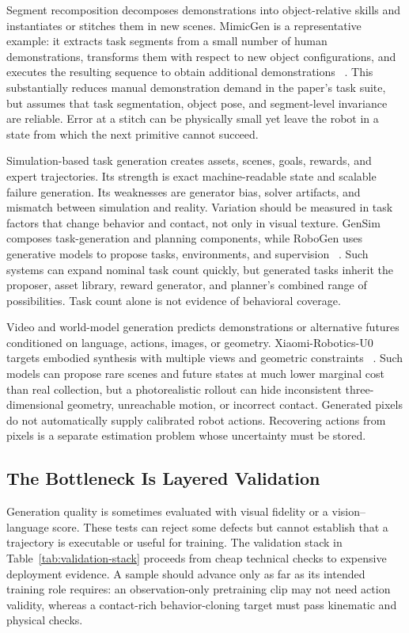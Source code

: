 Segment recomposition decomposes demonstrations into object-relative skills and instantiates or stitches them in new scenes.
MimicGen is a representative example: it extracts task segments from a small number of human demonstrations, transforms them with respect to new object configurations, and executes the resulting sequence to obtain additional demonstrations ~\cite{mandlekar2023mimicgen_2310_17596}.
This substantially reduces manual demonstration demand in the paper's task suite, but assumes that task segmentation, object pose, and segment-level invariance are reliable.
Error at a stitch can be physically small yet leave the robot in a state from which the next primitive cannot succeed.

Simulation-based task generation creates assets, scenes, goals, rewards, and expert trajectories.
Its strength is exact machine-readable state and scalable failure generation.
Its weaknesses are generator bias, solver artifacts, and mismatch between simulation and reality.
Variation should be measured in task factors that change behavior and contact, not only in visual texture.
GenSim composes task-generation and planning components, while RoboGen uses generative models to propose tasks, environments, and supervision ~\cite{wang2023gensim_2310_01361,wang2023robogen_2311_01455}.
Such systems can expand nominal task count quickly, but generated tasks inherit the proposer, asset library, reward generator, and planner's combined range of possibilities.
Task count alone is not evidence of behavioral coverage.

Video and world-model generation predicts demonstrations or alternative futures conditioned on language, actions, images, or geometry.
Xiaomi-Robotics-U0 targets embodied synthesis with multiple views and geometric constraints ~\cite{li2026xiaomi_2607_11643}.
Such models can propose rare scenes and future states at much lower marginal cost than real collection, but a photorealistic rollout can hide inconsistent three-dimensional geometry, unreachable motion, or incorrect contact.
Generated pixels do not automatically supply calibrated robot actions.
Recovering actions from pixels is a separate estimation problem whose uncertainty must be stored.

\subsection{The Bottleneck Is Layered Validation}

Generation quality is sometimes evaluated with visual fidelity or a vision--language score.
These tests can reject some defects but cannot establish that a trajectory is executable or useful for training.
The validation stack in Table~\ref{tab:validation-stack} proceeds from cheap technical checks to expensive deployment evidence.
A sample should advance only as far as its intended training role requires: an observation-only pretraining clip may not need action validity, whereas a contact-rich behavior-cloning target must pass kinematic and physical checks.

